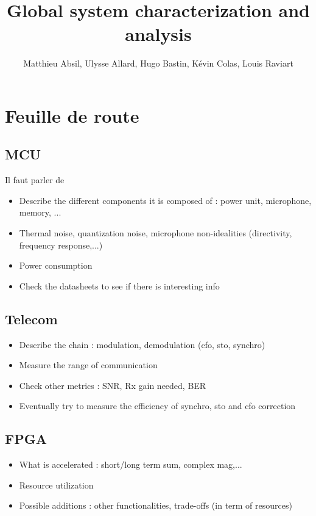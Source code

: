 \documentclass{article}
\title{Global system characterization and analysis}
\author{Matthieu Absil, Ulysse Allard, Hugo Bastin, Kévin Colas, Louis Raviart}
\date{}
\begin{document}
\maketitle

\section{Feuille de route}

\subsection{MCU}
Il faut parler de 
\begin{itemize}
    \item Describe the different components it is composed of : power unit, microphone, memory, ...
    \item Thermal noise, quantization noise, microphone non-idealities (directivity, frequency response,...)
    \item Power consumption 
    \item Check the datasheets to see if there is interesting info   
\end{itemize}

\subsection{Telecom}
\begin{itemize}
    \item Describe the chain : modulation, demodulation (cfo, sto, synchro) 
    \item Measure the range of communication
    \item Check other metrics : SNR, Rx gain needed, BER
    \item Eventually try to measure the efficiency of synchro, sto and cfo correction
\end{itemize}

\subsection{FPGA}
\begin{itemize}
    \item What is accelerated : short/long term sum, complex mag,...
    \item Resource utilization 
    \item Possible additions : other functionalities, trade-offs (in term of resources)
\end{itemize}
\end{document}
